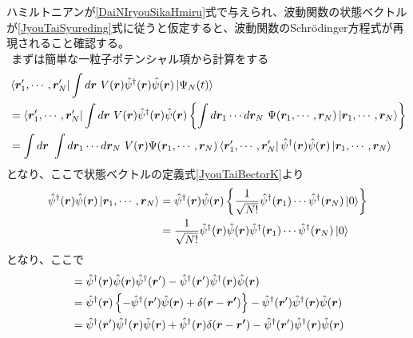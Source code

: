 \documentclass[dvipdfmx, 11pt, a4paper]{jsarticle}
\theoremstyle{definition}
\numberwithin{equation}{section}
\begin{document}
    \begin{derivationBox}
        ハミルトニアンが\eqref{DaiNIryouSikaHmiru}式で与えられ、波動関数の状態ベクトルが\eqref{JyouTaiSyureding}式に従うと仮定すると、波動関数のSchrödinger方程式が再現されること確認する。\\
        $\ \ $まずは簡単な一粒子ポテンシャル項から計算をする
        \begin{align}
            &\bra{\bm{r}'_1,\cdots,\bm{r}'_N}\int d\bm{r}\ V(\bm{r}) \hat{\psi}^\dagger(\bm{r})\hat{\psi}(\bm{r}) \ket{\Psi_N(t)}\notag \\
            &= \bra{\bm{r}'_1,\cdots,\bm{r}'_N}\int d\bm{r}\ V(\bm{r}) \hat{\psi}^\dagger(\bm{r})\hat{\psi}(\bm{r}) \left\{ \int d\bm{r}_1\cdots d\bm{r}_N\ \Psi(\bm{r}_1,\cdots,\bm{r}_N) \ket{\bm{r}_1, \cdots ,\bm{r}_N} \right\} \notag \\
            &= \int d\bm{r}\ \int d\bm{r}_1\cdots d\bm{r}_N\  V(\bm{r}) \Psi(\bm{r}_1,\cdots,\bm{r}_N) \bra{\bm{r}'_1,\cdots,\bm{r}'_N}\hat{\psi}^\dagger(\bm{r})\hat{\psi}(\bm{r})\ket{\bm{r}_1, \cdots ,\bm{r}_N} 
        \end{align}
        となり、ここで状態ベクトルの定義式\eqref{JyouTaiBectorK}より
        \begin{align}
            \hat{\psi}^\dagger(\bm{r})\hat{\psi}(\bm{r})\ket{\bm{r}_1, \cdots ,\bm{r}_N} 
            &= \hat{\psi}^\dagger(\bm{r})\hat{\psi}(\bm{r})\left\{ \frac{1}{\sqrt{N!}}\hat{\psi}^\dagger(\bm{r}_1)\cdots\hat{\psi}^\dagger(\bm{r}_N)\ket{0} \right\} \notag \\
            &= \frac{1}{\sqrt{N!}}\hat{\psi}^\dagger(\bm{r})\hat{\psi}(\bm{r}) \hat{\psi}^\dagger(\bm{r}_1)\cdots\hat{\psi}^\dagger(\bm{r}_N)\ket{0}
        \end{align}
        となり、ここで
        \begin{align}
            [ \hat{\psi}^\dagger(\bm{r}) \hat{\psi}(\bm{r}), \hat{\psi}^\dagger(\bm{r}')] &=  \hat{\psi}^\dagger(\bm{r}) \hat{\psi}(\bm{r})\hat{\psi}^\dagger(\bm{r}') - \hat{\psi}^\dagger(\bm{r}')\hat{\psi}^\dagger(\bm{r}) \hat{\psi}(\bm{r}) \notag \\
            &=  \hat{\psi}^\dagger(\bm{r}) \left\{ -\hat{\psi}^\dagger(\bm{r}')\hat{\psi}(\bm{r}) + \delta(\bm{r}-\bm{r'}) \right\} - \hat{\psi}^\dagger(\bm{r}')\hat{\psi}^\dagger(\bm{r}) \hat{\psi}(\bm{r}) \notag \\
            &=  \hat{\psi}^\dagger(\bm{r}')\hat{\psi}^\dagger(\bm{r})\hat{\psi}(\bm{r}) + \hat{\psi}^\dagger(\bm{r}) \delta(\bm{r}-\bm{r'}) - \hat{\psi}^\dagger(\bm{r}')\hat{\psi}^\dagger(\bm{r}) \hat{\psi}(\bm{r})\notag \\

\end{align}
\end{derivationBox}
\end{document}
